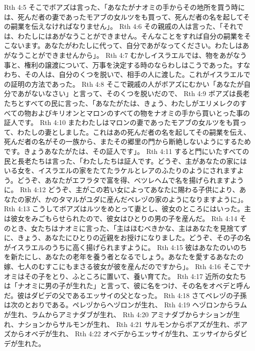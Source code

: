 Rth 4:5  そこでボアズは言った、「あなたがナオミの手からその地所を買う時には、死んだ者の妻であったモアブの女ルツをも買って、死んだ者の名を起してその嗣業を伝えなければなりません」。
Rth 4:6  その親戚の人は言った、「それでは、わたしにはあがなうことができません。そんなことをすれば自分の嗣業をそこないます。あなたがわたしに代って、自分であがなってください。わたしはあがなうことができませんから」。
Rth 4:7  むかしイスラエルでは、物をあがなう事と、権利の譲渡について、万事を決定する時のならわしはこうであった。すなわち、その人は、自分のくつを脱いで、相手の人に渡した。これがイスラエルでの証明の方法であった。
Rth 4:8  そこで親戚の人がボアズにむかい「あなたが自分であがないなさい」と言って、そのくつを脱いだので、
Rth 4:9  ボアズは長老たちとすべての民に言った、「あなたがたは、きょう、わたしがエリメレクのすべての物およびキリオンとマロンのすべての物をナオミの手から買いとった事の証人です。
Rth 4:10  またわたしはマロンの妻であったモアブの女ルツをも買って、わたしの妻としました。これはあの死んだ者の名を起してその嗣業を伝え、死んだ者の名がその一族から、またその郷里の門から断絶しないようにするためです。きょうあなたがたは、その証人です」。
Rth 4:11  すると門にいたすべての民と長老たちは言った、「わたしたちは証人です。どうぞ、主があなたの家にはいる女を、イスラエルの家をたてたラケルとレアのふたりのようにされますよう。どうぞ、あなたがエフラタで富を得、ベツレヘムで名を揚げられますように。
Rth 4:12  どうぞ、主がこの若い女によってあなたに賜わる子供により、あなたの家が、かのタマルがユダに産んだペレヅの家のようになりますように」。
Rth 4:13  こうしてボアズはルツをめとって妻とし、彼女のところにはいった。主は彼女をみごもらせられたので、彼女はひとりの男の子を産んだ。
Rth 4:14  そのとき、女たちはナオミに言った、「主はほむべきかな、主はあなたを見捨てずに、きょう、あなたにひとりの近親をお授けになりました。どうぞ、その子の名がイスラエルのうちに高く揚げられますように。
Rth 4:15  彼はあなたのいのちを新たにし、あなたの老年を養う者となるでしょう。あなたを愛するあなたの嫁、七人のむすこにもまさる彼女が彼を産んだのですから」。
Rth 4:16  そこでナオミはその子をとり、ふところに置いて、養い育てた。
Rth 4:17  近所の女たちは「ナオミに男の子が生れた」と言って、彼に名をつけ、その名をオベデと呼んだ。彼はダビデの父であるエッサイの父となった。
Rth 4:18  さてペレヅの子孫は次のとおりである。ペレヅからヘヅロンが生れ、
Rth 4:19  ヘヅロンからラムが生れ、ラムからアミナダブが生れ、
Rth 4:20  アミナダブからナションが生れ、ナションからサルモンが生れ、
Rth 4:21  サルモンからボアズが生れ、ボアズからオベデが生れ、
Rth 4:22  オベデからエッサイが生れ、エッサイからダビデが生れた。


